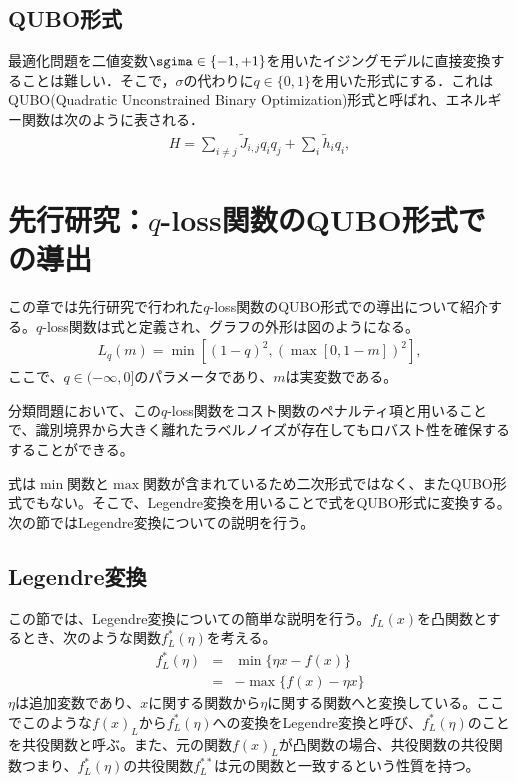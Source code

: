 \documentclass[paper]{ieicej}
\begin{document}
\subsection{QUBO形式}
最適化問題を二値変数$\sgima\in\{-1,+1\}$を用いたイジングモデルに直接変換することは難しい．そこで，$\sigma$の代わりに$q\in\{0,1\}$を用いた形式にする．これはQUBO(Quadratic Unconstrained Binary Optimization)形式と呼ばれ、エネルギー関数は次のように表される．
\begin{eqnarray}
 H = \sum_{i\neq j}{\widetilde{J}_{i,j}q_{i}q_{j}}+\sum_{i}{\widetilde{h}_{i}q_{i}}, \label{QUBO_model}
\end{eqnarray}

\section{先行研究：$q$-loss関数のQUBO形式での導出}
この章では先行研究で行われた$q$-loss関数のQUBO形式での導出について紹介する。$q$-loss関数は式と定義され、グラフの外形は図のようになる。
\begin{eqnarray}
 L_{q}(m) = \min{[(1-q)^{2},(\max{[0,1-m]})^{2}]},
\end{eqnarray}
ここで、$q\in(-\infty,0]$のパラメータであり、$m$は実変数である。

分類問題において、この$q$-loss関数をコスト関数のペナルティ項と用いることで、識別境界から大きく離れたラベルノイズが存在してもロバスト性を確保するすることができる。

式は$\min$関数と$\max$関数が含まれているため二次形式ではなく、またQUBO形式でもない。そこで、Legendre変換を用いることで式をQUBO形式に変換する。次の節ではLegendre変換についての説明を行う。

\subsection{Legendre変換}
この節では、Legendre変換についての簡単な説明を行う。$f_{L}(x)$を凸関数とするとき、次のような関数$f^{*}_{L}(\eta)$を考える。
\begin{eqnarray}
 f^{*}_{L}(\eta) &=& \min{\{\eta x-f(x)\}} \\
                 &=& -\max{\{f(x)-\eta x\}}
\end{eqnarray}
$\eta$は追加変数であり、$x$に関する関数から$\eta$に関する関数へと変換している。ここでこのような$f(x)_{L}$から$f^{*}_{L}(\eta)$への変換をLegendre変換と呼び、$f^{*}_{L}(\eta)$のことを共役関数と呼ぶ。また、元の関数$f(x)_{L}$が凸関数の場合、共役関数の共役関数つまり、$f^{*}_{L}(\eta)$の共役関数$f^{**}_{L}$は元の関数と一致するという性質を持つ。
\end{document}
